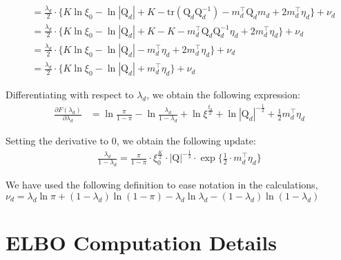 \documentclass[twoside,11pt]{article}
\newcommand{\transpose}[1]{#1^{\intercal}}
\newcommand{\qmat}{\mathrm{Q}}
\newcommand{\trace}[1]{\mathrm{tr} \left( #1 \right)}
\begin{document}
\begin{align*}
	&= \frac{\lambda_d}{2} \cdot \Bigg\{ K \ln \xi_0 - \ln |\qmat_d | + K -  \trace{\qmat_d \qmat_d^{-1}} - \transpose{m_d} \qmat_d m_d + 2\transpose{m_d}\eta_d \Bigg\} + \nu_d\\ 
	&= \frac{\lambda_d}{2} \cdot \Bigg\{ K \ln \xi_0 - \ln |\qmat_d | + K - K - \transpose{m_d} \qmat_d \qmat_d^{-1} \eta_d + 2\transpose{m_d}\eta_d \Bigg\} + \nu_d\\ 
	&= \frac{\lambda_d}{2} \cdot \Bigg\{ K \ln \xi_0 - \ln |\qmat_d | - \transpose{m_d} \eta_d + 2\transpose{m_d}\eta_d \Bigg\} + \nu_d\\ 
	&= \frac{\lambda_d}{2} \cdot \Bigg\{ K \ln \xi_0 - \ln |\qmat_d | + \transpose{m_d} \eta_d \Bigg\} + \nu_d
\end{align*}

Differentiating with respect to $\lambda_d$, we obtain the following expression:
\begin{align*}
	\frac{\partial F(\lambda_d)}{\partial \lambda_d} &= \ln \frac{\pi}{1-\pi} - \ln \frac{\lambda_d}{1-\lambda_d} + \ln \xi^{\frac{\xi_0}{2}} + \ln |\qmat_d|^{- \frac{1}{2}} + \frac{1}{2} \transpose{m_d} \eta_d
\end{align*}

Setting the derivative to 0, we obtain the following update:
\begin{align*}
	\frac{\lambda_d}{1- \lambda_d} = \frac{\pi}{1-\pi} \cdot \xi_0^{\frac{K}{2}} \cdot |\qmat|^{-\frac{1}{2}} \cdot \exp \Big\{ \frac{1}{2} \cdot \transpose{m_d} \eta_d\Big\}
\end{align*}

We have used the following definition to ease notation in the calculations, $\nu_d = \lambda_d \ln \pi + (1 - \lambda_d) \ln(1-\pi) - \lambda_d \ln \lambda_d - (1 - \lambda_d) \ln (1 - \lambda_d)$

\newpage

\section{ELBO Computation Details}

\end{document}
